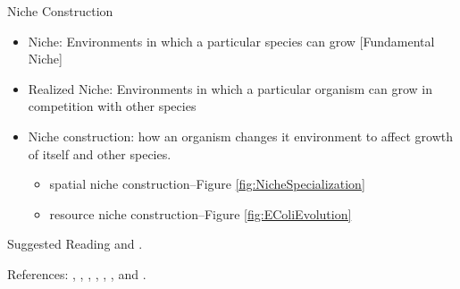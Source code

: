 \documentclass[]{article}
\begin{document}
Niche Construction

\begin{itemize}
	\item Niche: Environments in which a particular species can grow [Fundamental Niche]
	\item Realized Niche: Environments in which a particular organism can grow in competition with other species
	\item Niche construction: how an organism changes it environment to affect growth of itself and other species.
	\begin{itemize}
		\item spatial niche construction--Figure \ref{fig:NicheSpecialization}
		\item resource niche construction--Figure \ref{fig:EColiEvolution}
	\end{itemize}  
\end{itemize}

Suggested Reading \cite{kassen2014experimental} and \cite{garland2009experimental}.

References: \cite{helling1987evolution}, \cite{saxer2009spatial}, \cite{escalante2015ecological}, \cite{rainey1998adaptive}, \cite{dykhuizen1998santa}, \cite{connell1961influence}, and \cite{hutchinson1959homage}.

\printglossaries

 


\end{document}
